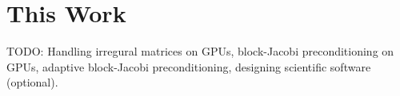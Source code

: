 





\section{This Work}
TODO: Handling irregural matrices on GPUs, block-Jacobi preconditioning on GPUs,
      adaptive block-Jacobi preconditioning, designing scientific software
      (optional).
